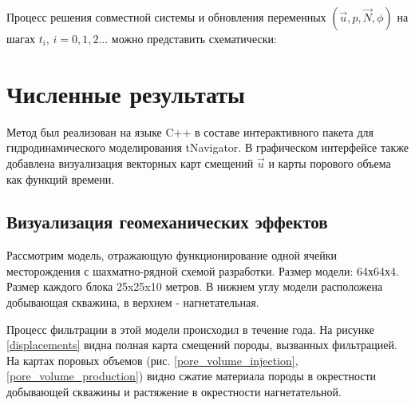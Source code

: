 \documentclass[11pt,twoside]{article}
\begin{document}
Процесс решения совместной системы и обновления переменных $(\vec{u}, p, \vec{N}, \phi)$ на шагах $t_i$, $i=0,1,2 \dots$ можно представить схематически:\\


\section{Численные результаты}
Метод был реализован на языке C++ в составе интерактивного пакета для гидродинамического моделирования tNavigator. В графическом интерфейсе также добавлена визуализация векторных карт смещений $\vec{u}$ и карты порового объема как функций времени.

\subsection{Визуализация геомеханических эффектов}
Рассмотрим модель, отражающую функционирование одной ячейки месторождения с шахматно-рядной схемой разработки. Размер модели: 64х64х4. Размер каждого блока 25x25x10 метров. В нижнем углу модели расположена добывающая скважина, в верхнем - нагнетательная.

Процесс фильтрации в этой модели происходил в течение года. На рисунке \ref{displacements} видна полная карта смещений породы, вызванных фильтрацией. На картах поровых объемов (рис. \ref{pore_volume_injection}, \ref{pore_volume_production}) видно сжатие материала породы в окрестности добывающей скважины и растяжение в окрестности нагнетательной.
\end{document}
